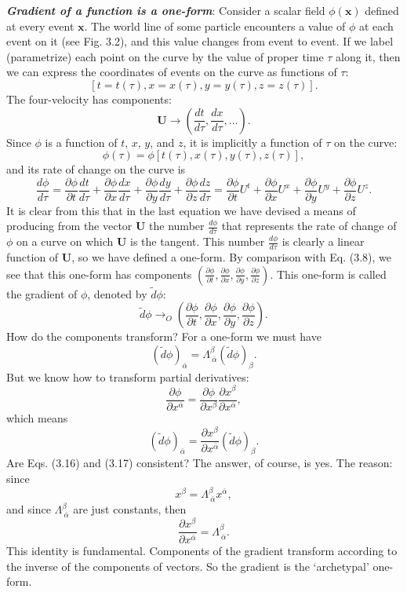 \documentclass[12pt]{book}
\begin{document}
    \textit{\textbf{Gradient of a function is a one-form}}: Consider a scalar field \(\phi(\mathbf{x})\) defined at every event \(\mathbf{x}\). The world line of some particle encounters a value of \(\phi\) at each event on it (see Fig. 3.2), and this value changes from event to event. If we label (parametrize) each point on the curve by the value of proper time \(\tau\) along it, then we can express the coordinates of events on the curve as functions of \(\tau\):
    \[
    [t = t(\tau), x = x(\tau), y = y(\tau), z = z(\tau)].
    \]
    The four-velocity has components:
    \[
    \mathbf{U} \rightarrow \left(\frac{d t}{d\tau}, \frac{d x}{d\tau}, \ldots\right).
    \]
    Since \(\phi\) is a function of \(t\), \(x\), \(y\), and \(z\), it is implicitly a function of \(\tau\) on the curve:
    \[
    \phi(\tau) = \phi[t(\tau), x(\tau), y(\tau), z(\tau)],
    \]
    and its rate of change on the curve is
    \[
    \frac{d\phi}{d\tau} = \frac{\partial \phi}{\partial t} \frac{d t}{d\tau}
    + \frac{\partial \phi}{\partial x} \frac{d x}{d\tau}
    + \frac{\partial \phi}{\partial y} \frac{d y}{d\tau}
    + \frac{\partial \phi}{\partial z} \frac{d z}{d\tau}
    = \frac{\partial \phi}{\partial t} U^t + \frac{\partial \phi}{\partial x} U^x + \frac{\partial \phi}{\partial y} U^y + \frac{\partial \phi}{\partial z} U^z. \tag{3.14}
    \]
    It is clear from this that in the last equation we have devised a means of producing from the vector \(\mathbf{U}\) the number \( \frac{d\phi}{d\tau} \) that represents the rate of change of \(\phi\) on a curve on which \(\mathbf{U}\) is the tangent. This number \( \frac{d\phi}{d\tau} \) is clearly a linear function of \(\mathbf{U}\), so we have defined a one-form. 
    By comparison with Eq. (3.8), we see that this one-form has components \(\left(\frac{\partial \phi}{\partial t}, \frac{\partial \phi}{\partial x}, \frac{\partial \phi}{\partial y}, \frac{\partial \phi}{\partial z}\right)\). This one-form is called the gradient of \(\phi\), denoted by \(\tilde{d}\phi\):
    \[
    \tilde{d}\phi \rightarrow_O \left(\frac{\partial \phi}{\partial t}, \frac{\partial \phi}{\partial x}, \frac{\partial \phi}{\partial y}, \frac{\partial \phi}{\partial z}\right). \tag{3.15}
    \]
    How do the components transform? For a one-form we must have
    \[
    (\tilde{d}\phi)_{\bar{\alpha}} = \Lambda^\beta_{\ \bar{\alpha}} (\tilde{d}\phi)_\beta. \tag{3.16}
    \]
    But we know how to transform partial derivatives:
    \[
    \frac{\partial \phi}{\partial x^{\bar{\alpha}}} = \frac{\partial \phi}{\partial x^\beta} \frac{\partial x^\beta}{\partial x^{\bar{\alpha}}},
    \]
    which means
    \[
    (\tilde{d}\phi)_{\bar{\alpha}} = \frac{\partial x^\beta}{\partial x^{\bar{\alpha}}} (\tilde{d}\phi)_\beta. \tag{3.17}
    \]
    Are Eqs. (3.16) and (3.17) consistent? The answer, of course, is yes. The reason: since
    \[
    x^\beta = \Lambda^\beta_{\ \bar{\alpha}} x^{\bar{\alpha}},
    \]
    and since \(\Lambda^\beta_{\ \bar{\alpha}}\) are just constants, then
    \[
    \frac{\partial x^\beta}{\partial x^{\bar{\alpha}}} = \Lambda^\beta_{\ \bar{\alpha}}. \tag{3.18}
    \]
    This identity is fundamental. Components of the gradient transform according to the inverse of the components of vectors. So the gradient is the ‘archetypal’ one-form.
\end{document}
